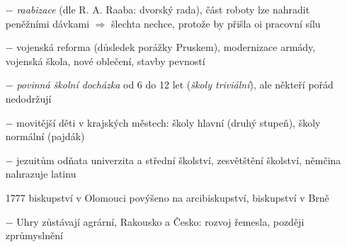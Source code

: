 \documentclass{article}
\begin{document}
\begin{itemize}
    \item[$-$] \textit{raabizace} (dle R. A. Raaba: dvorský rada), část roboty lze nahradit peněžními dávkami $\Rightarrow$ šlechta nechce, protože by přišla oi pracovní sílu
    \item[$-$] vojenská reforma (důsledek porážky Pruskem), modernizace armády, vojenská škola, nové oblečení, stavby pevností
    \item[$-$] \textit{povinná školní docházka} od 6 do 12 let (\textit{školy triviální}), ale někteří pořád nedodržují
    \item[$-$] movitější děti v krajských městech: školy hlavní (druhý stupeň), školy normální (pajdák)
    \item[$-$] jezuitům odňata univerzita a střední školství, zesvětštění školství, němčina nahrazuje latinu
    \item[1777] biskupství v Olomouci povýšeno na arcibiskupství, biskupství v Brně
    \item[$-$] Uhry zůstávají agrární, Rakousko a Česko: rozvoj řemesla, později zprůmyslnění
\end{itemize}
\end{document}
